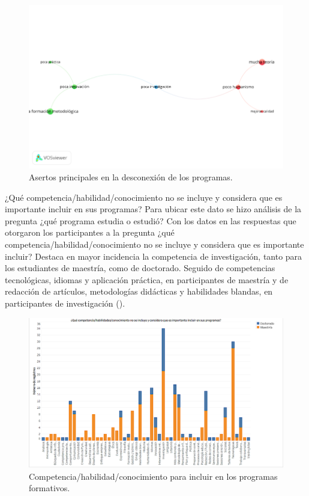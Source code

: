 \documentclass[spanish]{textolivre}
\begin{document}
\begin{figure}[htbp]
 \hspace*{-1.3in}
 \includegraphics[width=1.22\textwidth]{Fig3.png}
 \caption{Asertos principales en la desconexión  de los programas.}
 \label{fig3}
\end{figure}

¿Qué competencia/habilidad/conocimiento no se incluye y considera que es importante incluir en sus programas? Para ubicar este dato se hizo análisis de la pregunta ¿qué programa estudia o estudió? Con los datos en las respuestas que otorgaron los participantes a la pregunta ¿qué competencia/habilidad/conocimiento no se incluye y considera que es importante incluir? Destaca en mayor incidencia la competencia de investigación, tanto para los estudiantes de maestría, como de doctorado. Seguido de competencias tecnológicas, idiomas y aplicación práctica, en participantes de maestría y de redacción de artículos, metodologías didácticas y habilidades blandas, en participantes de investigación ().

\begin{figure}[htbp]
 \hspace*{-1.3in}
 \includegraphics[width=1.22\textwidth]{Fig4.png}
 \caption{Competencia/habilidad/conocimiento para incluir en los programas formativos.}
 \label{fig4}
\end{figure}
\end{document}
